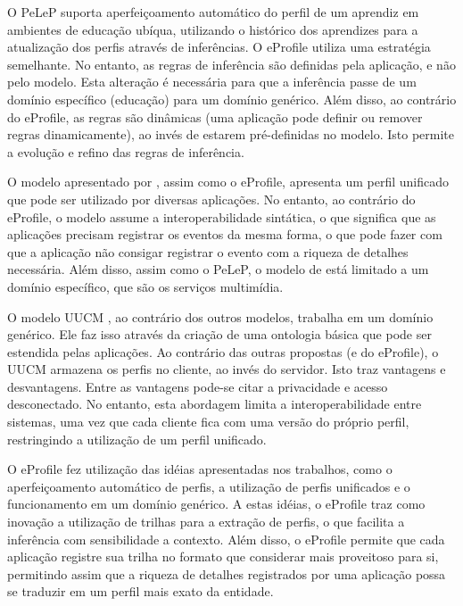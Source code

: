 
O PeLeP \cite{pelep} suporta aperfeiçoamento automático do perfil de um aprendiz em ambientes de educação ubíqua, utilizando o histórico dos aprendizes para a atualização dos perfis através de inferências. O eProfile utiliza uma estratégia semelhante. No entanto, as regras de inferência são definidas pela aplicação, e não pelo modelo. Esta alteração é necessária para que a inferência passe de um domínio específico (educação) para um domínio genérico. Além disso, ao contrário do eProfile, as regras são dinâmicas (uma aplicação pode definir ou remover regras dinamicamente), ao invés de estarem pré-definidas no modelo. Isto permite a evolução e refino das regras de inferência.

O modelo apresentado por , assim como o eProfile, apresenta um perfil unificado que pode ser utilizado por diversas aplicações. No entanto, ao contrário do eProfile, o modelo assume a interoperabilidade sintática, o que significa que as aplicações precisam registrar os eventos da mesma forma, o que pode fazer com que a aplicação não consigar registrar o evento com a riqueza de detalhes necessária. Além disso, assim como o PeLeP, o modelo de  está limitado a um domínio específico, que são os serviços multimídia.

O modelo UUCM \cite{niederee04}, ao contrário dos outros modelos, trabalha em um domínio genérico. Ele faz isso através da criação de uma ontologia básica que pode ser estendida pelas aplicações. Ao contrário das outras propostas (e do eProfile), o UUCM armazena os perfis no cliente, ao invés do servidor. Isto traz vantagens e desvantagens. Entre as vantagens pode-se citar a privacidade e acesso desconectado. No entanto, esta abordagem limita a interoperabilidade entre sistemas, uma vez que cada cliente fica com uma versão do próprio perfil, restringindo a utilização de um perfil unificado.

O eProfile fez utilização das idéias apresentadas nos trabalhos, como o aperfeiçoamento automático de perfis, a utilização de perfis unificados e o funcionamento em um domínio genérico. A estas idéias, o eProfile traz como inovação a utilização de trilhas para a extração de perfis, o que facilita a inferência com sensibilidade a contexto. Além disso, o eProfile permite que cada aplicação registre sua trilha no formato que considerar mais proveitoso para si, permitindo assim que a riqueza de detalhes registrados por uma aplicação possa se traduzir em um perfil mais exato da entidade.

